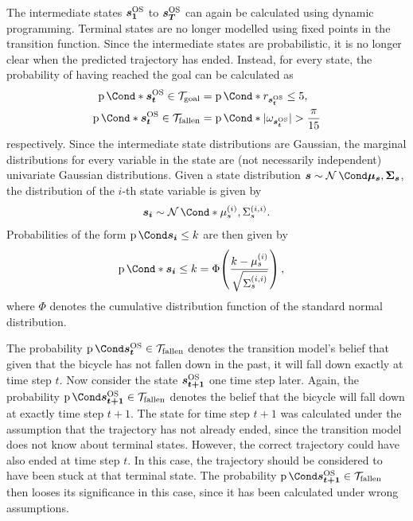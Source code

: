 The intermediate states $\bm{s_1}^{\text{OS}}$ to $\bm{s_T}^{\text{OS}}$ can again be calculated using dynamic programming.
Terminal states are no longer modelled using fixed points in the transition function.
Since the intermediate states are probabilistic, it is no longer clear when the predicted trajectory has ended.
Instead, for every state, the probability of having reached the goal can be calculated as
\begin{align}
    \label{eq:terminal_probabilies}
    \begin{split}
        \Prob*{\os{\mat{s_t}} \in \Goal} &= \Prob*{r_{\os{\mat{s_t}}} \leq 5}, \\
        \Prob*{\os{\mat{s_t}} \in \Fallen} &= \Prob*{\abs{\omega_{\os{\mat{s_t}}}} > \frac{\pi}{15}}
    \end{split}
\end{align}
respectively.
Since the intermediate state distributions are Gaussian, the marginal distributions for every variable in the state are (not necessarily independent) univariate Gaussian distributions.
Given a state distribution $\rv{s} \sim \Gaussian{\mat{\mu_s}, \mat{\Sigma_s}}$, the distribution of the $i$-th state variable is given by
\begin{align}
    \rv{s_i} \sim \Gaussian*{\mu_{s}^{(i)}, \Sigma_{s}^{(i,i)}}.
\end{align}
Probabilities of the form $\Prob{\rv{s_i} \leq k}$ are then given by
\begin{align}
    \Prob*{\rv{s_i} \leq k} &= \Phi\!\left( \frac{k - \mu_s^{(i)}}{\sqrt{\Sigma_s^{(i,i)}}} \right),
\end{align}
where $\Phi$ denotes the cumulative distribution function of the standard normal distribution.

The probability $\Prob{\os{\mat{s_t}} \in \Fallen}$ denotes the transition model's belief that given that the bicycle has not fallen down in the past, it will fall down exactly at time step $t$.
Now consider the state $\bm{s_{t+1}}^{\text{OS}}$ one time step later.
Again, the probability $\Prob{\os{\mat{s_{t+1}}} \in \Fallen}$ denotes the belief that the bicycle will fall down at exactly time step $t+1$.
The state for time step $t+1$ was calculated under the assumption that the trajectory has not already ended, since the transition model does not know about terminal states.
However, the correct trajectory could have also ended at time step $t$.
In this case, the trajectory should be considered to have been stuck at that terminal state.
The probability $\Prob{\os{\mat{s_{t+1}}} \in \Fallen}$ then looses its significance in this case, since it has been calculated under wrong assumptions.

